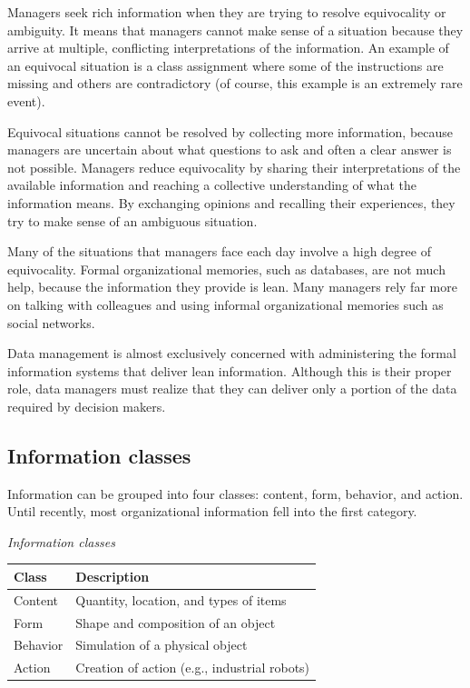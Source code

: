 \documentclass[
]{article}
\begin{document}
Managers seek rich information when they are trying to resolve
equivocality or ambiguity. It means that managers cannot make sense of a
situation because they arrive at multiple, conflicting interpretations
of the information. An example of an equivocal situation is a class
assignment where some of the instructions are missing and others are
contradictory (of course, this example is an extremely rare event).

Equivocal situations cannot be resolved by collecting more information,
because managers are uncertain about what questions to ask and often a
clear answer is not possible. Managers reduce equivocality by sharing
their interpretations of the available information and reaching a
collective understanding of what the information means. By exchanging
opinions and recalling their experiences, they try to make sense of an
ambiguous situation.

Many of the situations that managers face each day involve a high degree
of equivocality. Formal organizational memories, such as databases, are
not much help, because the information they provide is lean. Many
managers rely far more on talking with colleagues and using informal
organizational memories such as social networks.

Data management is almost exclusively concerned with administering the
formal information systems that deliver lean information. Although this
is their proper role, data managers must realize that they can deliver
only a portion of the data required by decision makers.

\hypertarget{information-classes}{%
\subsection*{Information classes}\label{information-classes}}

Information can be grouped into four classes: content, form, behavior,
and action. Until recently, most organizational information fell into
the first category.

\emph{Information classes}

\begin{longtable}[]{@{}
  >{\raggedright\arraybackslash}p{}
  >{\raggedright\arraybackslash}p{}@{}}
\toprule
Class & Description \\
\midrule
\endhead
Content & Quantity, location, and types of items \\
Form & Shape and composition of an object \\
Behavior & Simulation of a physical object \\
Action & Creation of action (e.g., industrial robots) \\
\bottomrule
\end{longtable}
\end{document}
